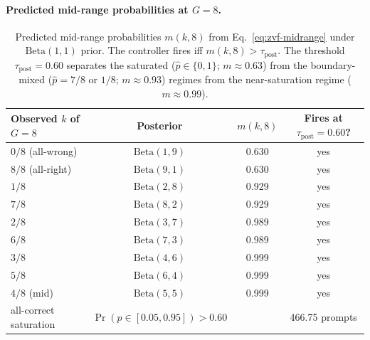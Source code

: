 \documentclass{article}
\begin{document}
\paragraph{Predicted mid-range probabilities at $G{=}8$.}
\begin{table}[t]
\centering
\caption{Predicted mid-range probabilities $m(k,8)$ from
Eq.~\eqref{eq:zvf-midrange} under $\mathrm{Beta}(1,1)$ prior. The
controller fires iff $m(k,8) > \tau_{\mathrm{post}}$. The threshold
$\tau_{\mathrm{post}}{=}0.60$ separates the saturated
($\hat p \in \{0,1\}$; $m \approx 0.63$) from the boundary-mixed
($\hat p = 7/8$ or $1/8$; $m \approx 0.93$) regimes from the
near-saturation regime ($m \approx 0.99$).}
\label{tab:p7-bayesian-mid}
\begin{tabular}{lccc}
\toprule
Observed $k$ of $G{=}8$ & Posterior & $m(k, 8)$ & Fires at $\tau_{\mathrm{post}}{=}0.60$? \\
\midrule
$0/8$  (all-wrong)  & $\mathrm{Beta}(1, 9)$   & 0.630 & yes \\
$8/8$  (all-right)  & $\mathrm{Beta}(9, 1)$   & 0.630 & yes \\
$1/8$               & $\mathrm{Beta}(2, 8)$   & 0.929 & yes \\
$7/8$               & $\mathrm{Beta}(8, 2)$   & 0.929 & yes \\
$2/8$               & $\mathrm{Beta}(3, 7)$   & 0.989 & yes \\
$6/8$               & $\mathrm{Beta}(7, 3)$   & 0.989 & yes \\
$3/8$               & $\mathrm{Beta}(4, 6)$   & 0.999 & yes \\
$5/8$               & $\mathrm{Beta}(6, 4)$   & 0.999 & yes \\
$4/8$  (mid)        & $\mathrm{Beta}(5, 5)$   & 0.999 & yes \\
\midrule
all-correct saturation & $\Pr(p \in [0.05, 0.95]) > 0.60$ &  & 466.75 prompts \\
\bottomrule
\end{tabular}
\end{table}
\end{document}
